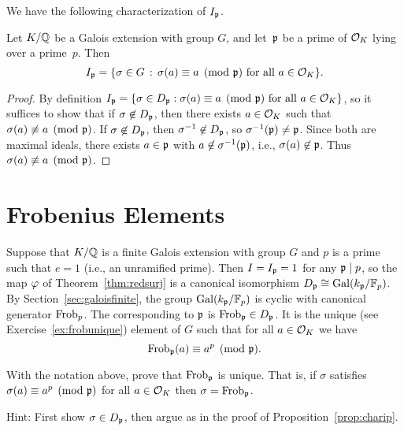 We have the following characterization of $I_{\mathfrak{p}}$.
\begin{proposition}\label{prop:charip}
Let $K/\mathbb{Q}$ be a Galois extension with group $G$,
and let~$\mathfrak{p}$ be a prime of $\mathcal{O}_K$ lying
over a prime~$p$.  Then
$$
I_{\mathfrak{p}} = \{\sigma\in G \, :\, \sigma(a) \equiv a\pmod{\mathfrak{p}}\text{ for all } a\in\mathcal{O}_K\}.
$$
\end{proposition}
\begin{proof}
  By definition $I_{\mathfrak{p}} = \{\sigma\in D_{\mathfrak{p}} : \sigma(a) \equiv
  a\pmod{\mathfrak{p}}\text{ for all } a\in\mathcal{O}_K\}$, so it suffices to show that
  if $\sigma\not\in D_{\mathfrak{p}}$, then there exists $a\in\mathcal{O}_K$ such that
  $\sigma(a)\not\equiv a\pmod{\mathfrak{p}}$.  If $\sigma\not\in D_{\mathfrak{p}}$, then
  $\sigma^{-1}\not\in D_{\mathfrak{p}}$, so $\sigma^{-1}(\mathfrak{p})\neq \mathfrak{p}$.  Since both
  are maximal ideals, there exists $a\in\mathfrak{p}$ with
  $a\not\in\sigma^{-1}(\mathfrak{p})$, i.e., $\sigma(a)\not\in\mathfrak{p}$.  Thus
  $\sigma(a)\not\equiv a\pmod{\mathfrak{p}}$.
\end{proof}



\section{Frobenius Elements}

Suppose that $K/\mathbb{Q}$ is a finite Galois extension with group $G$ and
$p$ is a prime such that $e=1$ (i.e., an unramified prime).  Then
$I=I_{\mathfrak{p}}=1$ for any $\mathfrak{p}\mid p$, so the map $\varphi$ of
Theorem~\ref{thm:redsurj}
is a canonical isomorphism $D_{\mathfrak{p}} \cong \operatorname{Gal}( k_{\mathfrak{p}}/\mathbb{F}_p)$.
By Section~\ref{sec:galoisfinite},
the group $\operatorname{Gal}( k_{\mathfrak{p}}/\mathbb{F}_p)$ is
cyclic with canonical generator $\operatorname{Frob}_p$.
The  corresponding to $\mathfrak{p}$ is
$\operatorname{Frob}_{\mathfrak{p}}\in D_{\mathfrak{p}}$. It is the unique (see Exercise~\ref{ex:frobunique})
element of $G$ such that for all
$a\in\mathcal{O}_K$ we have
$$
  \operatorname{Frob}_{\mathfrak{p}}(a)\equiv a^p\pmod{\mathfrak{p}}.
$$


\begin{exercise}\label{ex:frobunique}
	With the notation above, prove that $\operatorname{Frob}_{\mathfrak{p}}$ is
	unique. That is, if $\sigma$ satisfies
	$\sigma(a) \equiv a^p \pmod{\mathfrak{p}}$ for all $a\in\mathcal{O}_K$
	then $\sigma = \operatorname{Frob}_{\mathfrak{p}}$.

	Hint: First show $\sigma\in D_{\mathfrak{p}}$, %
	then argue as in the proof of Proposition~\ref{prop:charip}.
\end{exercise}


